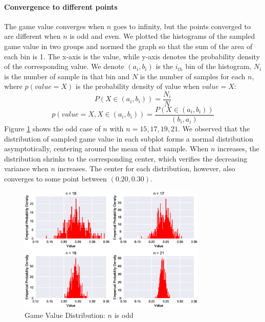 \documentclass[a4paper,english]{article}
\begin{document}
\begin{spacing}{1.4}
\paragraph{Convergence to different points}
The game value converges when $n$ goes to infinity, but the points converged to are different when $n$ is odd and even.
We plotted the histograms of the sampled game value in two groups and normed the graph so that the sum of the area of each bin is 1. The x-axis is the value, while y-axis denotes the probability density of the corresponding value. We denote $(a_i,b_i)$ is the $i_{th}$ bin of the histogram, $N_i$ is the number of sample in that bin and $N$ is the number of samples for each $n$, where $p(value=X)$ is the probability density of value when $value = X$:
\begin{equation*}
    P(X \in (a_i,b_i)) = \frac{N_i}{N}
\end{equation*}
\begin{equation*}
    p(value = X, X \in (a_i,b_i)) = \frac{P(X \in (a_i,b_i))}{(b_i,a_i)}
\end{equation*}
Figure \ref{distribution-odd} shows the odd case of $n$ with $n=15,17,19,21$. We observed that the distribution of sampled game value in each subplot forms a normal distribution asymptotically, centering around the mean of that sample. When $n$ increases, the distribution shrinks to the corresponding center, which verifies the decreasing variance when $n$ increases. The center for each distribution, however, also converges to some point between $(0.20,0.30)$.

\begin{figure}[!htb]
\centering
\includegraphics[width=0.8\textwidth]{figures/plot2.eps}
\caption{Game Value Distribution: $n$ is odd}
\label{distribution-odd}
\end{figure}


\end{spacing}
\end{document}
